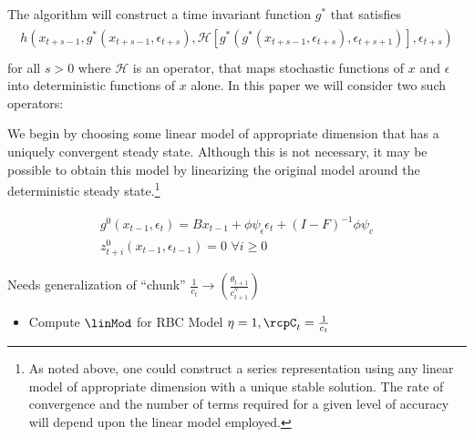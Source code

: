 \documentclass[12pt]{article}
\begin{document}
The algorithm will construct
 a time invariant function $g^\ast$ that satisfies
\begin{gather}
  \begin{split}
h(x_{t+s-1},g^\ast(x_{t+s-1},\epsilon_{t+s}),\mathcal{H}[g^\ast(g^\ast(x_{t+s-1},\epsilon_{t+s}),\epsilon_{t+s+1})],\epsilon_{t+s}) \label{theProblem} \\
  \end{split}
 \end{gather}
 for all $s>0$ where $\mathcal{H}$ is an operator, 
  that maps stochastic functions of $x$ and $\epsilon$ into deterministic 
functions of $x$ alone.  In this paper we will consider two such operators:










We begin by choosing some linear model of appropriate dimension that 
has a uniquely convergent steady state.  
Although this is not necessary, it may be possible to obtain this model by
linearizing the original model around the deterministic steady state.\footnote{As noted above, one could construct a series representation using any linear
 model of appropriate dimension with a unique stable solution.  The rate of convergence and the number of terms required for a  given level of accuracy will depend upon the linear model employed.}


 \begin{gather}
 g^0(x_{t-1},\epsilon_{t})=  
B x_{t-1}+ \phi \psi_\epsilon\epsilon_{t} +
 (I - F)^{-1} \phi \psi_c\\ \label{firstIter}
z^{0}_{t+i}(x_{t-1},\epsilon_{t-1})=0 \,\, \forall i \ge 0
 \end{gather}


Needs generalization of ``chunk'' $\frac{1}{c_t}\rightarrow \left (\frac{\theta_{t+1}}{c_{t+1}^\eta} \right )$

  \begin{itemize}
  \item Compute $\linMod$ for RBC Model $\eta=1,\rcpC_t=\frac{1}{c_t}$
  \end{itemize}
\end{document}
